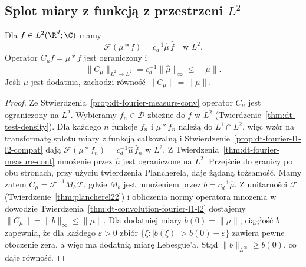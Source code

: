 \subsection{Splot miary z funkcją z przestrzeni \texorpdfstring{$L^2$}{L2}}

\begin{twierdzenie}
\label{thm:dt-fourier-measure-l2}
Dla $f\in L^2(\R^d;\C)$ mamy
\[
 \mathcal F(\mu*f)=c_d^{-1}\widehat\mu\,\widehat f
 \quad\text{w }L^2.
\]
Operator $C_\mu f=\mu*f$ jest ograniczony i
\[
 \|C_\mu\|_{L^2\to L^2}=c_d^{-1}\|\widehat\mu\|_\infty
 \le\|\mu\|.
\]
Jeśli $\mu$ jest dodatnia, zachodzi równość
$\|C_\mu\|=\|\mu\|$.
\end{twierdzenie}
\begin{proof}
Ze Stwierdzenia~\ref{prop:dt-fourier-measure-conv}
operator $C_\mu$ jest ograniczony na $L^2$.
Wybieramy $f_n\in\mathcal D$ zbieżne do $f$ w $L^2$
(Twierdzenie~\ref{thm:dt-test-density}).
Dla każdego $n$ funkcje $f_n$ i $\mu*f_n$
należą do $L^1\cap L^2$, więc wzór na transformatę
splotu miary z funkcją całkowalną i
Stwierdzenie~\ref{prop:dt-fourier-l1-l2-compat}
dają $\mathcal F(\mu*f_n)=c_d^{-1}\widehat\mu\,\widehat f_n$
w $L^2$.
Z Twierdzenia~\ref{thm:dt-fourier-measure-cont}
mnożenie przez $\widehat\mu$ jest ograniczone na $L^2$.
Przejście do granicy po obu stronach, przy użyciu
twierdzenia Plancherela, daje żądaną tożsamość.
Mamy zatem $C_\mu=\mathcal F^{-1}M_b\mathcal F$,
gdzie $M_b$ jest mnożeniem przez $b=c_d^{-1}\widehat\mu$.
Z unitarności $\mathcal F$
(Twierdzenie~\ref{thm:plancherel22}) i obliczenia normy
operatora mnożenia w dowodzie
Twierdzenia~\ref{thm:dt-convolution-fourier-l1-l2}
dostajemy $\|C_\mu\|=\|b\|_\infty\le\|\mu\|$.
Dla dodatniej miary $b(0)=\|\mu\|$; ciągłość $b$
zapewnia, że dla każdego $\varepsilon>0$ zbiór
$\{\xi:|b(\xi)|>b(0)-\varepsilon\}$ zawiera pewne
otoczenie zera, a więc ma dodatnią miarę Lebesgue'a.
Stąd $\|b\|_{L^\infty}\ge b(0)$, co daje równość.
\end{proof}

